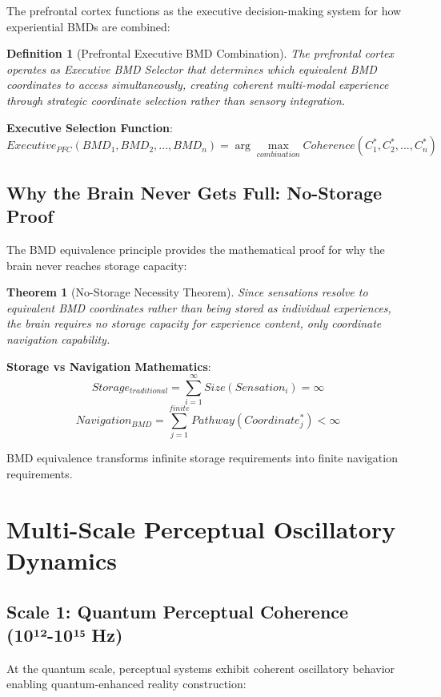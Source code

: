 \documentclass[12pt,a4paper]{article}
\newtheorem{theorem}{Theorem}
\newtheorem{definition}{Definition}
\begin{document}
The prefrontal cortex functions as the executive decision-making system for how experiential BMDs are combined:

\begin{definition}[Prefrontal Executive BMD Combination]
The prefrontal cortex operates as Executive BMD Selector that determines which equivalent BMD coordinates to access simultaneously, creating coherent multi-modal experience through strategic coordinate selection rather than sensory integration.
\end{definition}

\textbf{Executive Selection Function}:
$$Executive_{PFC}(BMD_1, BMD_2, ..., BMD_n) = \arg\max_{combination} Coherence(C_1^*, C_2^*, ..., C_n^*)$$

\subsection{Why the Brain Never Gets Full: No-Storage Proof}

The BMD equivalence principle provides the mathematical proof for why the brain never reaches storage capacity:

\begin{theorem}[No-Storage Necessity Theorem]
Since sensations resolve to equivalent BMD coordinates rather than being stored as individual experiences, the brain requires no storage capacity for experience content, only coordinate navigation capability.
\end{theorem}

\textbf{Storage vs Navigation Mathematics}:
$$Storage_{traditional} = \sum_{i=1}^{\infty} Size(Sensation_i) = \infty$$
$$Navigation_{BMD} = \sum_{j=1}^{finite} Pathway(Coordinate_j^*) < \infty$$

BMD equivalence transforms infinite storage requirements into finite navigation requirements.

\section{Multi-Scale Perceptual Oscillatory Dynamics}

\subsection{Scale 1: Quantum Perceptual Coherence (10¹²-10¹⁵ Hz)}

At the quantum scale, perceptual systems exhibit coherent oscillatory behavior enabling quantum-enhanced reality construction:
\end{document}

